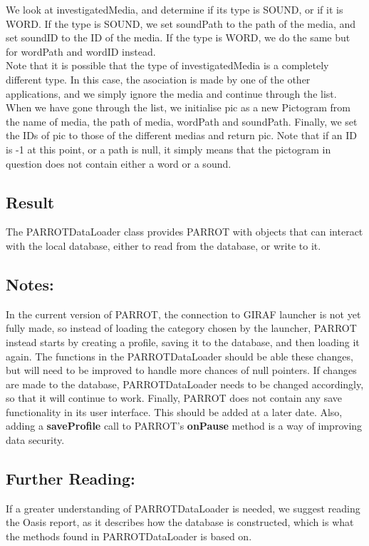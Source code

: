 We look at investigatedMedia, and determine if its type is SOUND, or if it is WORD.
If the type is SOUND, we set soundPath to the path of the media, and set soundID to the ID of the media.
If the type is WORD, we do the same but for wordPath and wordID instead.\\
Note that it is possible that the type of investigatedMedia is a completely different type. In this case, the asociation is made by one of the other applications, and we simply ignore the media and continue through the list.\\
When we have gone through the list, we initialise pic as a new Pictogram from the name of media, the path of media, wordPath and soundPath.
Finally, we set the IDs of pic to those of the different medias and return pic.\newline
Note that if an ID is -1 at this point, or a path is null, it simply means that the pictogram in question does not contain either a word or a sound.

\subsection*{Result}
The PARROTDataLoader class provides PARROT with objects that can interact with the local database, either to read from the database, or write to it.

\subsection*{Notes:}
In the current version of PARROT, the connection to GIRAF launcher is not yet fully made, so instead of loading the category chosen by the launcher, PARROT instead starts by creating a profile, saving it to the database, and then loading it again.
The functions in the PARROTDataLoader should be able these changes, but will need to be improved to handle more chances of null pointers.\newline
If changes are made to the database, PARROTDataLoader needs to be changed accordingly, so that it will continue to work.\newline
Finally, PARROT does not contain any save functionality in its user interface.
This should be added at a later date.
Also, adding a \textbf{saveProfile} call to PARROT's \textbf{onPause} method is a way of improving data security.

\subsection*{Further Reading:}
If a greater understanding of PARROTDataLoader is needed, we suggest reading the Oasis report, as it describes how the database is constructed, which is what the methods found in PARROTDataLoader is based on.